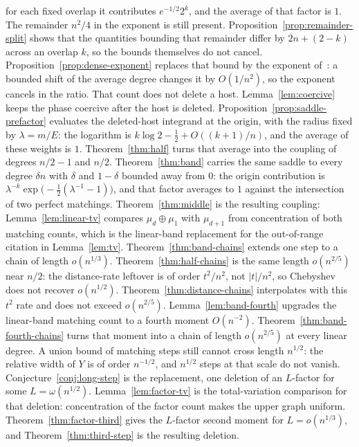 \documentclass[11pt]{article}
\begin{document}
for each fixed overlap it contributes \(e^{-1/2}2^{k}\), and the average of that factor is \(1\).
The remainder \(n^2/4\) in the exponent is still present.
Proposition~\ref{prop:remainder-split} shows that the quantities bounding that remainder
differ by \(2n+(2-k)\) across an overlap \(k\), so the bounds themselves do not cancel.
Proposition~\ref{prop:dense-exponent} replaces that bound by the exponent of~\cite[Theorem~1]{MW90}:
a bounded shift of the average degree changes it by \(O(1/n^2)\), so the exponent cancels in the ratio.
That count does not delete a host.
Lemma~\ref{lem:coercive} keeps the phase coercive after the host is deleted.
Proposition~\ref{prop:saddle-prefactor} evaluates the deleted-host integrand at the origin, with the radius fixed by \(\lambda=m/E\): the logarithm is \(k\log 2-\frac12+O((k+1)/n)\), and the average of these weights is \(1\).
Theorem~\ref{thm:half} turns that average into the coupling of degrees \(n/2-1\) and \(n/2\).
Theorem~\ref{thm:band} carries the same saddle to every degree \(\delta n\) with \(\delta\) and \(1-\delta\) bounded away from \(0\): the origin contribution is \(\lambda^{-k}\exp\bigl(-\tfrac12(\lambda^{-1}-1)\bigr)\), and that factor averages to \(1\) against the intersection of two perfect matchings.
Theorem~\ref{thm:middle} is the resulting coupling: Lemma~\ref{lem:linear-tv} compares \(\mu_d\oplus\mu_1\) with \(\mu_{d+1}\) from concentration of both matching counts, which is the linear-band replacement for the out-of-range citation in Lemma~\ref{lem:tv}.
Theorem~\ref{thm:band-chains} extends one step to a chain of length \(o(n^{1/3})\).
Theorem~\ref{thm:half-chains} is the same length \(o(n^{2/5})\) near \(n/2\): the distance-rate leftover is of order \(t^2/n^2\), not \(|t|/n^2\), so Chebyshev does not recover \(o(n^{1/2})\).
Theorem~\ref{thm:distance-chains} interpolates with this \(t^2\) rate and does not exceed \(o(n^{2/5})\).
Lemma~\ref{lem:band-fourth} upgrades the linear-band matching count to a fourth moment \(O(n^{-2})\).
Theorem~\ref{thm:band-fourth-chains} turns that moment into a chain of length \(o(n^{2/5})\) at every linear degree.
A union bound of matching steps still cannot cross length \(n^{1/2}\): the relative width of \(Y\) is of order \(n^{-1/2}\), and \(n^{1/2}\) steps at that scale do not vanish.
Conjecture~\ref{conj:long-step} is the replacement, one deletion of an \(L\)-factor for some \(L=\omega(n^{1/2})\).
Lemma~\ref{lem:factor-tv} is the total-variation comparison for that deletion: concentration of the factor count makes the upper graph uniform.
Theorem~\ref{thm:factor-third} gives the \(L\)-factor second moment for \(L=o(n^{1/3})\), and Theorem~\ref{thm:third-step} is the resulting deletion.
\end{document}

